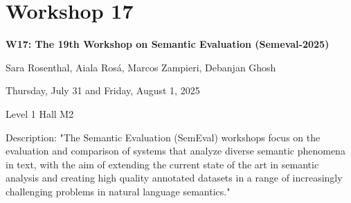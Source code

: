\clearpage



\section[W17: The 19th Workshop on Semantic Evaluation (Semeval-2025)]{Workshop 17}

\begin{center}
    {\Large \textbf{W17: The 19th Workshop on Semantic Evaluation (Semeval-2025)}}

   Sara Rosenthal, Aiala Rosá, Marcos Zampieri, Debanjan Ghosh
    
    Thursday, July 31 and Friday, August 1, 2025
    
    Level 1 Hall M2

\end{center}

Description: "The Semantic Evaluation (SemEval) workshops focus on the evaluation and comparison of systems that
analyze diverse semantic phenomena in text, with the aim of extending the current state of the art in
semantic analysis and creating high quality annotated datasets in a range of increasingly challenging
problems in natural language semantics."

